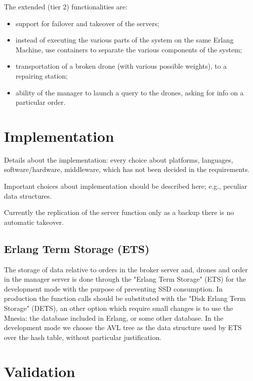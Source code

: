 \documentclass[a4paper, oneside]{memoir}
\begin{document}
The extended (tier 2) functionalities are:
\begin{itemize}
\item support for failover and takeover of the servers;
\item instead of executing the various parts of the system on the same Erlang Machine, use containers to separate the various components of the system;
\item transportation of a broken drone (with various possible weights), to a repairing station;
\item ability of the manager to launch a query to the drones, asking for info on a particular order.
\end{itemize}


\chapter{Implementation}

Details about the implementation: every choice about platforms, languages, software/hardware, middleware, which has not been decided in the requirements.


Important choices about implementation should be described here; e.g., peculiar data structures.

Currently the replication of the server function only as a backup there is no automatic takeover.
\section{Erlang Term Storage (ETS)}
The storage of data relative to orders in the broker server and, drones and order in the manager server is done through the "Erlang Term Storage" (ETS) for the development mode with the purpose of preventing SSD consumption. In production the function calls should be substituted with the "Disk Erlang Term Storage" (DETS), an other option which require small changes is to use the Mnesia: the database included in Erlang, or some other database. In the development mode we choose the AVL tree as the data structure used by ETS over the hash table, without particular justification.

\chapter{Validation}
\end{document}
